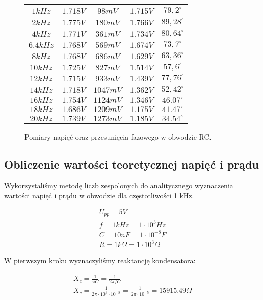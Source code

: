 \documentclass[polish,polish,a4paper]{article}
\begin{document}
\begin{figure}[H]
\begin{tabular}{|c|c|c|c|c|}
$1 kHz$ & $1.718 V$ & $98 mV$ & $1.715 V$ & $79,2 ^{\circ}$ \\ \hline
$2 kHz$ & $1.775 V$ & $180 mV$ & $1.766 V$ & $89,28 ^{\circ}$ \\ \hline
$4 kHz$ & $1.771 V$ & $361 mV$ & $1.734 V$ & $80,64 ^{\circ}$ \\ \hline
$6.4 kHz$ & $1.768 V$ & $569 mV$ & $1.674 V$ & $73,7 ^{\circ} $ \\ \hline
$8 kHz$ & $1.768 V$ & $686 mV$ & $1.629 V$ & $63,36 ^{\circ}$ \\ \hline
$10 kHz$ & $1.725 V$ & $827 mV$ & $1.514 V$ & $57,6 ^{\circ}$ \\ \hline
$12 kHz$ & $1.715 V$ & $933 mV$ & $1.439 V$ & $77,76 ^{\circ}$ \\ \hline
$14 kHz$ & $1.718 V$ & $1047 mV$ & $1.362 V$ & $52,42 ^{\circ}$ \\ \hline
$16 kHz$ & $1.754 V$ & $1124 mV$ & $1.346 V$ & $46.07 ^{\circ}$ \\ \hline
$18 kHz$ & $1.686 V$ & $1209 mV$ & $1.175 V$ & $41.47 ^{\circ}$ \\ \hline
$20 kHz$ & $1.739 V$ & $1273 mV$ & $1.185 V$ & $34.54 ^{\circ}$ \\ \hline


\end{tabular}
\caption{Pomiary napięć oraz przesunięcia fazowego w obwodzie RC.}
\end{figure}

\newpage
\subsection{Obliczenie wartości teoretycznej napięć i prądu}

Wykorzystaliśmy metodę liczb zespolonych do analitycznego wyznaczenia wartości napięć i prądu w obwodzie dla częstotliwości 1 kHz. 

\begin{gather}
U_{pp} = 5 V \\
f = 1 kHz = 1 \cdot 10^3 Hz \\ 
C = 10 nF = 1 \cdot 10^{-8} F \\
R = 1k\Omega = 1 \cdot 10^3 \Omega
\end{gather}

W pierwszym kroku wyznaczyliśmy reaktancję kondensatora: 

\begin{gather}
X_c = \frac{1}{\omega C} = \frac{1}{2 \pi f C} \\
X_c = \frac{1}{2 \pi \cdot 10^3 \cdot 10^{-8}} =  \frac{1}{2 \pi \cdot 10^{-5}} = 15915.49 \Omega
\end{gather}
\end{document}
